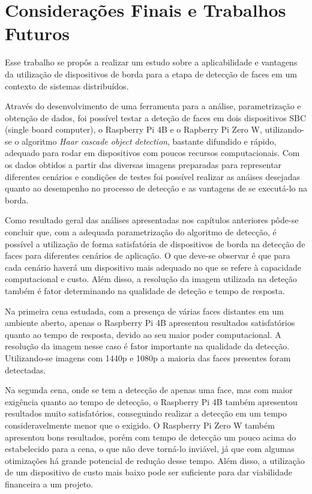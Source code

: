 \chapter{Considerações Finais e Trabalhos \mbox{Futuros}}\label{cap:conclusao}
\thispagestyle{plain}

Esse trabalho se propôs a realizar um estudo sobre a aplicabilidade e vantagens da utilização de dispositivos de borda para a etapa de detecção de faces em um contexto de sistemas distribuídos.

Através do desenvolvimento de uma ferramenta para a análise, parametrização e obtenção de dados, foi possível testar a deteção de faces em dois dispositivos SBC (single board computer), o Raspberry Pi 4B e o Rapberry Pi Zero W, utilizando-se o algoritmo \textit{Haar cascade object detection}, bastante difundido e rápido, adequado para rodar em dispositivos com poucos recursos computacionais. Com os dados obtidos a partir das diversas imagens preparadas para representar diferentes cenários e condições de testes foi possível realizar as anáises desejadas quanto ao desempenho no processo de detecção e as vantagens de se executá-lo na borda.

Como resultado geral das análises apresentadas nos capítulos anteriores pôde-se concluir que, com a adequada parametrização do algoritmo de detecção, é possível a utilização de forma satisfatória de dispositivos de borda na detecção de faces para diferentes cenários de aplicação. O que deve-se observar é que para cada cenário haverá um dispositivo mais adequado no que se refere à capacidade computacional e custo. Além disso, a resolução da imagem utilizada na deteção também é fator determinando na qualidade de deteção e tempo de resposta.

Na primeira cena estudada, com a presença de várias faces distantes em um ambiente aberto, apenas o Raspberry Pi 4B apresentou resultados satisfatórios quanto ao tempo de resposta, devido ao seu maior poder computacional. A resolução da imagem nesse caso é fator importante na qualidade da detecção. Utilizando-se imagens com 1440p e 1080p a maioria das faces presentes foram detectadas.

Na segunda cena, onde se tem a detecção de apenas uma face, mas com maior exigência quanto ao tempo de detecção, o Raspberry Pi 4B também apresentou resultados muito satisfatórios, conseguindo realizar a detecção em um tempo consideravelmente menor que o exigido. O Raspberry Pi Zero W também apresentou bons resultados, porém com tempo de detecção um pouco acima do estabelecido para a cena, o que não deve torná-lo inviável, já que com algumas otimizações há grande potencial de redução desse tempo. Além disso, a utilização de um dispositivo de custo mais baixo pode ser suficiente para dar viabilidade financeira a um projeto.

